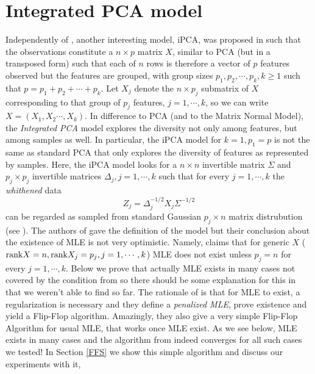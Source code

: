 \documentclass[reqno]{amsart}
\theoremstyle{plain}
\theoremstyle{definition}
\theoremstyle{remark}
\begin{document}
\section{Integrated PCA model}
Independently of \cite{am}, another interesting model, iPCA, was proposed in \cite{ta} such that the observations constitute  a $n\times p$ matrix $X$, similar to PCA (but in a transposed form) such that each of $n$ rows is therefore a vector of $p$ features observed but the features are grouped, with group sizes $p_1,p_2,\cdots,p_k, k\geq 1$ such that $p=p_1+p_2+\cdots+p_k$. Let $X_j$ denote the $n\times p_j$ submatrix of $X$ corresponding to that group of $p_j$ features, $j=1,\cdots,k$, so we can write $X=(X_1,X_2\cdots,X_k)$.
In difference to PCA (and to the Matrix Normal Model), the {\it Integrated PCA} model explores the diversity not only among features, but among samples as well. In particular, the iPCA model for $k=1, p_1=p$ is not the same as standard PCA that only explores the diversity of features as represented by samples. Here, the iPCA model looks for a $n\times n$ invertible matrix $\Sigma$ and $p_j\times p_j$ invertible matrices $\Delta_j,j=1,\cdots,k$ such that for every $j=1,\cdots,k$ the {\it whithened} data
\begin{equation}
Z_j=\Delta_j^{-1/2}X_j\Sigma^{-1/2}
\end{equation}
can be regarded as sampled from standard Gaussian $p_j\times n$ matrix distrubution (see \cite[formula~(5)]{ta}). The authors of \cite{ta} gave the definition of the model but their conclusion about the existence of MLE is not very optimistic. Namely, \cite[Theorem~5]{ta} claims that for generic $X$ (${\rm rank} X = n, {\rm rank} X_j=p_j,j=1,\cdots,k$) MLE does not exist unless $p_j=n$ for every $j=1,\cdots,k$. Below we prove that actually MLE exists in many cases not covered by the condition from \cite{ta} so there should be some explanation for this in \cite{ta} that we weren't able to find so far. The rationale of \cite{ta} is that for MLE to exist, a regularization is necessary and they define a {\it penalized MLE}, prove existence and yield a Flip-Flop algorithm. Amazingly, they also give a very simple Flip-Flop Algorithm for usual MLE, \cite[Algorithm~2]{ta} that works once MLE exist. As we see below, MLE exists in many cases and the algorithm from \cite{ta} indeed converges for all such cases we tested! In Section \ref{FFS} we show this simple algorithm and discuss our experiments with it,
\end{document}
